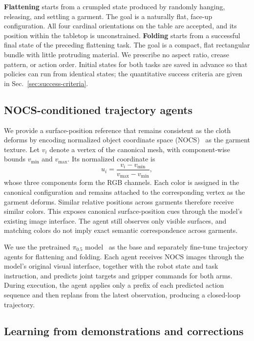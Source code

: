 \textbf{Flattening} starts from a crumpled state produced by randomly hanging,
releasing, and settling a garment. The goal is a naturally flat, face-up
configuration. All four cardinal orientations on the table are accepted, and its
position within the tabletop is unconstrained. \textbf{Folding} starts from a
successful final state of the preceding flattening task. The goal is a compact,
flat rectangular bundle with little protruding material. We prescribe no
aspect ratio, crease pattern, or action order. Initial states for both tasks
are saved in advance so that policies can run from identical states; the
quantitative success criteria are given in Sec.~\ref{sec:success-criteria}.

\subsection{NOCS-conditioned trajectory agents}

We provide a surface-position reference that remains consistent as the cloth
deforms by encoding normalized object coordinate space
(NOCS)~\cite{wang2019nocs} as the garment texture. Let $v_i$ denote a vertex
of the canonical mesh, with component-wise bounds $v_{\min}$ and $v_{\max}$.
Its normalized coordinate is
\begin{equation}
  u_i=\frac{v_i-v_{\min}}{v_{\max}-v_{\min}},
  \label{eq:nocs-color}
\end{equation}
whose three components form the RGB channels. Each color is assigned in the
canonical configuration and remains attached to the corresponding vertex as
the garment deforms. Similar relative positions across garments therefore
receive similar colors. This exposes canonical surface-position cues through
the model's existing image interface. The agent still observes only visible
surfaces, and matching colors do not imply exact semantic correspondence
across garments.

We use the pretrained $\pi_{0.5}$ model~\cite{pi05} as the base and separately
fine-tune trajectory agents for flattening and folding. Each agent receives
NOCS images through the model's original visual interface, together with the
robot state and task instruction, and predicts joint targets and gripper
commands for both arms. During execution, the agent applies only a prefix of
each predicted action sequence and then replans from the latest observation,
producing a closed-loop trajectory.

\subsection{Learning from demonstrations and corrections}
\label{sec:experience-corrections}

